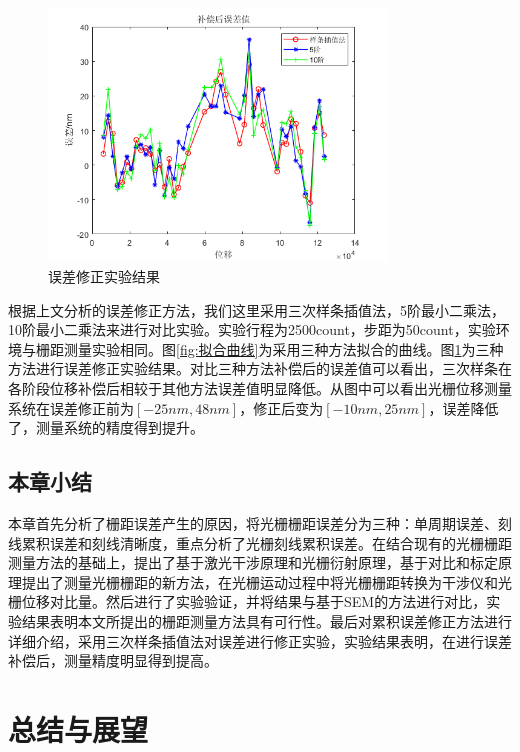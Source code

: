 \documentclass[type=master,oneside]{fduthesis}
\begin{document}
\begin{figure}[H]
  \centering
  \includegraphics[width=0.8\textwidth]{5-fig//误差修正实验结果.png}
  \caption{误差修正实验结果}
  \label{fig:误差修正实验结果}
\end{figure}

根据上文分析的误差修正方法，我们这里采用三次样条插值法，5阶最小二乘法，10阶最小二乘法来进行对比实验。实验行程为2500count，步距为50count，实验环境与栅距测量实验相同。图\ref{fig:拟合曲线}为采用三种方法拟合的曲线。图\ref{fig:误差修正实验结果}为三种方法进行误差修正实验结果。对比三种方法补偿后的误差值可以看出，三次样条在各阶段位移补偿后相较于其他方法误差值明显降低。从图中可以看出光栅位移测量系统在误差修正前为$[-25nm,48nm]$，修正后变为$[-10nm,25nm]$，误差降低了，测量系统的精度得到提升。



\section{本章小结}
本章首先分析了栅距误差产生的原因，将光栅栅距误差分为三种：单周期误差、刻线累积误差和刻线清晰度，重点分析了光栅刻线累积误差。在结合现有的光栅栅距测量方法的基础上，提出了基于激光干涉原理和光栅衍射原理，基于对比和标定原理提出了测量光栅栅距的新方法，在光栅运动过程中将光栅栅距转换为干涉仪和光栅位移对比量。然后进行了实验验证，并将结果与基于SEM的方法进行对比，实验结果表明本文所提出的栅距测量方法具有可行性。最后对累积误差修正方法进行详细介绍，采用三次样条插值法对误差进行修正实验，实验结果表明，在进行误差补偿后，测量精度明显得到提高。




\chapter{总结与展望}
\end{document}
